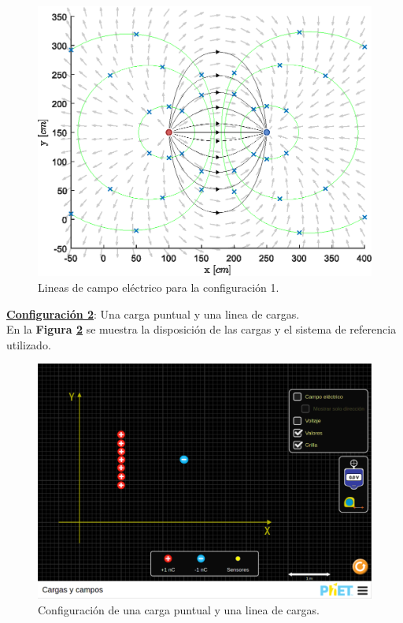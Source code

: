 \documentclass[letter,11pt]{article}
\begin{document}
\begin{figure}[!h]
\centering
\includegraphics[scale=0.91]{resources/p1.eps}
\caption{Lineas de campo eléctrico para la configuración 1.}
\label{figura4}
\end{figure}

\vspace{0.45cm}
\textbf{\underline{Configuración 2}}: Una carga puntual y una linea de cargas. \\

En la \textbf{Figura \ref{figura5}} se muestra la disposición de las cargas y el
sistema de referencia utilizado.

\begin{figure}[!h]
\centering
\includegraphics[scale=0.34]{resources/figura05.eps}
\caption{Configuración de una carga puntual y una linea de cargas.}
\label{figura5}
\end{figure}
\end{document}
